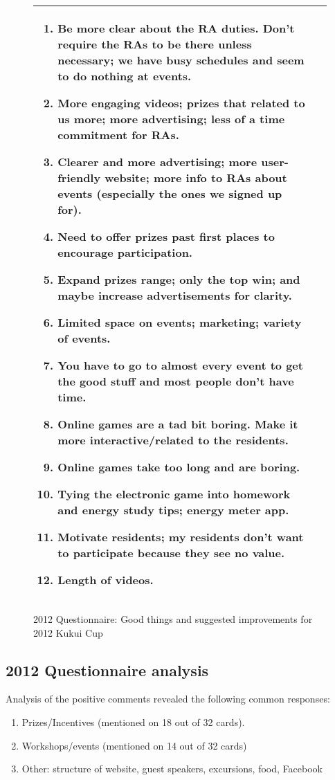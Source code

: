 \documentclass[]{article}
\begin{document}
\begin{figure*}[th!]
\begin{tabular}{|l|l|}
\begin{minipage}[t]{4.0in}
\begin{enumerate}
\item 	Be more clear about the RA duties.  Don't require the RAs to be there unless necessary; we have busy schedules and seem to do nothing at events.
\item 	More engaging videos; prizes that related to us more; more advertising; less of a time commitment for RAs.
\item 	Clearer and more advertising; more user-friendly website; more info to RAs about events (especially the ones we signed up for).
\item 	Need to offer prizes past first places to encourage participation.
\item 	Expand prizes range; only the top win; and maybe increase advertisements for clarity.
\item 	Limited space on events; marketing; variety of events.
\item 	You have to go to almost every event to get the good stuff and most people don't have time.
\item 	Online games are a tad bit boring.  Make it more interactive/related to the residents.
\item 	Online games take too long and are boring.
\item 	Tying the electronic game into homework and energy study tips; energy meter app.
\item 	Motivate residents; my residents don't want to participate because they see no value.
\item 	Length of videos. 
\end{enumerate}
\end{minipage}  \normalsize
\\
\hline
\end{tabular}
\caption{2012 Questionnaire: Good things and suggested improvements for 2012 Kukui Cup}
\label{fig:2012-questionnaire-results}
\end{figure*}

\subsection{2012 Questionnaire analysis}

Analysis of the positive comments revealed the following common responses:

\begin{enumerate}[noitemsep]
\item Prizes/Incentives (mentioned on 18 out of 32 cards).
\item Workshops/events (mentioned on 14 out of 32 cards)
\item Other: structure of website, guest speakers, excursions, food, Facebook
\end{enumerate}
\end{document}
